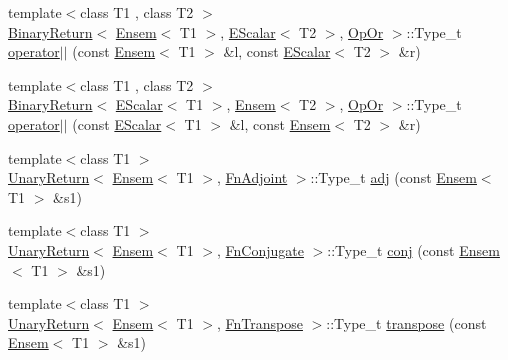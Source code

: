 \begin{DoxyCompactItemize}
\item 
{\footnotesize template$<$class T1 , class T2 $>$ }\\\mbox{\hyperlink{structENSEM_1_1BinaryReturn}{Binary\+Return}}$<$ \mbox{\hyperlink{classENSEM_1_1Ensem}{Ensem}}$<$ T1 $>$, \mbox{\hyperlink{classENSEM_1_1EScalar}{E\+Scalar}}$<$ T2 $>$, \mbox{\hyperlink{structENSEM_1_1OpOr}{Op\+Or}} $>$\+::Type\+\_\+t \mbox{\hyperlink{group__eensem_ga575e86e9777d7a353311ab43c237a84b}{operator$\vert$$\vert$}} (const \mbox{\hyperlink{classENSEM_1_1Ensem}{Ensem}}$<$ T1 $>$ \&l, const \mbox{\hyperlink{classENSEM_1_1EScalar}{E\+Scalar}}$<$ T2 $>$ \&r)
\item 
{\footnotesize template$<$class T1 , class T2 $>$ }\\\mbox{\hyperlink{structENSEM_1_1BinaryReturn}{Binary\+Return}}$<$ \mbox{\hyperlink{classENSEM_1_1EScalar}{E\+Scalar}}$<$ T1 $>$, \mbox{\hyperlink{classENSEM_1_1Ensem}{Ensem}}$<$ T2 $>$, \mbox{\hyperlink{structENSEM_1_1OpOr}{Op\+Or}} $>$\+::Type\+\_\+t \mbox{\hyperlink{group__eensem_ga433f0b529c387d8299dd5c8eb5a9b3b0}{operator$\vert$$\vert$}} (const \mbox{\hyperlink{classENSEM_1_1EScalar}{E\+Scalar}}$<$ T1 $>$ \&l, const \mbox{\hyperlink{classENSEM_1_1Ensem}{Ensem}}$<$ T2 $>$ \&r)
\item 
{\footnotesize template$<$class T1 $>$ }\\\mbox{\hyperlink{structENSEM_1_1UnaryReturn}{Unary\+Return}}$<$ \mbox{\hyperlink{classENSEM_1_1Ensem}{Ensem}}$<$ T1 $>$, \mbox{\hyperlink{structENSEM_1_1FnAdjoint}{Fn\+Adjoint}} $>$\+::Type\+\_\+t \mbox{\hyperlink{group__eensem_ga3c4b288659953aefecfc3a19bb11f326}{adj}} (const \mbox{\hyperlink{classENSEM_1_1Ensem}{Ensem}}$<$ T1 $>$ \&s1)
\item 
{\footnotesize template$<$class T1 $>$ }\\\mbox{\hyperlink{structENSEM_1_1UnaryReturn}{Unary\+Return}}$<$ \mbox{\hyperlink{classENSEM_1_1Ensem}{Ensem}}$<$ T1 $>$, \mbox{\hyperlink{structENSEM_1_1FnConjugate}{Fn\+Conjugate}} $>$\+::Type\+\_\+t \mbox{\hyperlink{group__eensem_ga539331970eb8111bc1c56f049612dce8}{conj}} (const \mbox{\hyperlink{classENSEM_1_1Ensem}{Ensem}}$<$ T1 $>$ \&s1)
\item 
{\footnotesize template$<$class T1 $>$ }\\\mbox{\hyperlink{structENSEM_1_1UnaryReturn}{Unary\+Return}}$<$ \mbox{\hyperlink{classENSEM_1_1Ensem}{Ensem}}$<$ T1 $>$, \mbox{\hyperlink{structENSEM_1_1FnTranspose}{Fn\+Transpose}} $>$\+::Type\+\_\+t \mbox{\hyperlink{group__eensem_gae77f21b6732b95bacf62ceb754c5ac17}{transpose}} (const \mbox{\hyperlink{classENSEM_1_1Ensem}{Ensem}}$<$ T1 $>$ \&s1)

\end{DoxyCompactItemize}
